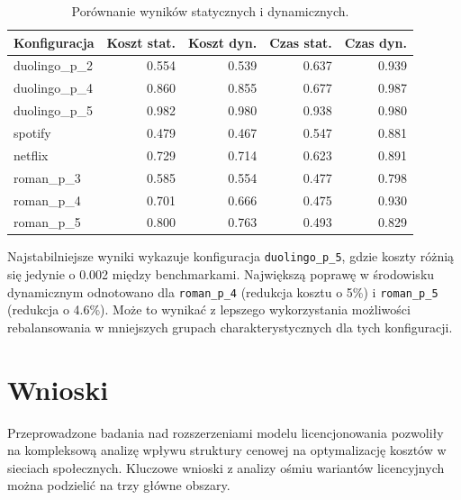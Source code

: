 \begin{table}[H]
    \centering
    \caption{Porównanie wyników statycznych i dynamicznych.}
    \label{tab:ext-static-dynamic-comparison}
    \begin{tabular}{lrrrr}
        \toprule
        \textbf{Konfiguracja} & \textbf{Koszt stat.} & \textbf{Koszt dyn.} & \textbf{Czas stat.} & \textbf{Czas dyn.} \\
        \midrule
        duolingo\_p\_2        & 0.554                & 0.539               & 0.637               & 0.939              \\
        duolingo\_p\_4        & 0.860                & 0.855               & 0.677               & 0.987              \\
        duolingo\_p\_5        & 0.982                & 0.980               & 0.938               & 0.980              \\
        spotify               & 0.479                & 0.467               & 0.547               & 0.881              \\
        netflix               & 0.729                & 0.714               & 0.623               & 0.891              \\
        roman\_p\_3           & 0.585                & 0.554               & 0.477               & 0.798              \\
        roman\_p\_4           & 0.701                & 0.666               & 0.475               & 0.930              \\
        roman\_p\_5           & 0.800                & 0.763               & 0.493               & 0.829              \\
        \bottomrule
    \end{tabular}
\end{table}

Najstabilniejsze wyniki wykazuje konfiguracja \texttt{duolingo\_p\_5}, gdzie koszty różnią się jedynie o 0.002 między benchmarkami. Największą poprawę w środowisku dynamicznym odnotowano dla \texttt{roman\_p\_4} (redukcja kosztu o 5\%) i \texttt{roman\_p\_5} (redukcja o 4.6\%). Może to wynikać z lepszego wykorzystania możliwości rebalansowania w mniejszych grupach charakterystycznych dla tych konfiguracji.
\section{Wnioski}

Przeprowadzone badania nad rozszerzeniami modelu licencjonowania pozwoliły na kompleksową analizę wpływu struktury cenowej na optymalizację kosztów w sieciach społecznych. Kluczowe wnioski z analizy ośmiu wariantów licencyjnych można podzielić na trzy główne obszary.

